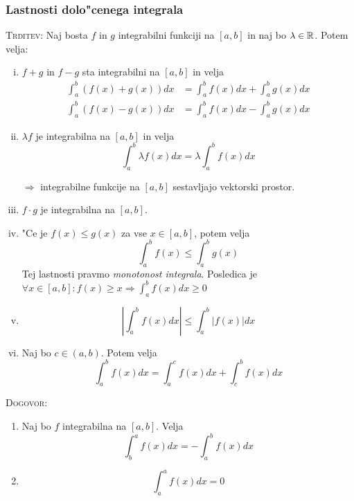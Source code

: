 \subsubsection{Lastnosti dolo"cenega integrala}
\textsc{Trditev:} Naj bosta $f$ in $g$ integrabilni funkciji na $[a, b]$ in naj bo $\lambda \in \mathbb{R}$. Potem velja:
\begin{enumerate}[(i)]
	\item $f+g$ in $f-g$ sta integrabilni na $[a, b]$ in velja
	\begin{align*}
	\int_{a}^{b} (f(x) + g(x)) dx &= \int_{a}^{b} f(x)dx + \int_{a}^{b} g(x)dx \\
	\int_{a}^{b} (f(x) - g(x)) dx &= \int_{a}^{b} f(x)dx - \int_{a}^{b} g(x)dx
	\end{align*}
	
	\item $\lambda f$ je integrabilna na $[a, b]$ in velja
	\begin{equation*}
	\int_{a}^{b} \lambda f(x) dx = \lambda \int_{a}^{b} f(x) dx
	\end{equation*}
	
	$\Rightarrow$ integrabilne funkcije na $[a, b]$ sestavljajo vektorski prostor.
	
	\item $f \cdot g$ je integrabilna na $[a, b]$.
	
	\item "Ce je $f(x) \leq g(x)$ za vse $x \in [a, b]$, potem velja
	\begin{equation*}
	\int_{a}^{b} f(x) \leq \int_{a}^{b} g(x)
	\end{equation*}
	Tej lastnosti pravmo \emph{monotonost integrala}. Posledica je $\forall x \in [a, b]: f(x) \geq x \Rightarrow \int_{a}^{b} f(x) dx \geq 0$
	
	\item 
	\begin{equation*}
	\left| \int_{a}^{b} f(x) dx \right| \leq \int_{a}^{b} \left| f(x) \right| dx
	\end{equation*}
	
	\item Naj bo $c \in (a, b)$. Potem velja
	\begin{equation*}
	\int_{a}^{b} f(x) dx = \int_{a}^{c} f(x) dx + \int_{c}^{b} f(x) dx
	\end{equation*}
\end{enumerate}
%
\textsc{Dogovor:} 
\begin{enumerate}
	\item Naj bo $f$ integrabilna na $[a, b]$. Velja
	\begin{equation*}
	\int_{b}^{a} f(x) dx = - \int_{a}^{b} f(x) dx
	\end{equation*}
	
	\item 
	\begin{equation*}
	\int_{a}^{a} f(x) dx = 0
	\end{equation*}
\end{enumerate}
